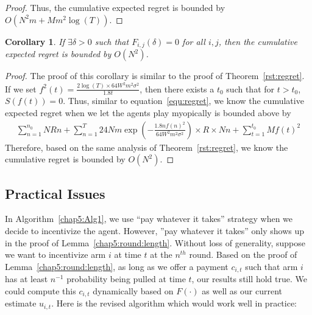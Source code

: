\documentclass{article}
\newtheorem{corollary}{Corollary}
\begin{document}
\begin{proof}
Thus, the cumulative expected regret is bounded by $O(N^2 m + M m^2\log(T))$.
\end{proof}

\begin{corollary}
If $\exists \delta>0$ such that $F_{i,j}(\delta)=0$ for all $i,j$, then the cumulative expected regret is bounded by $O(N^2)$.
\end{corollary}

\begin{proof}
The proof of this corollary is similar to the proof of Theorem~\ref{rst:regret}. If we set $f^2(t)=\frac{2\log(T)\times 64W^2 m^2\sigma^2}{1.8t}$, then there exists a $t_{0}$ such that for $t>t_{0}$, $S(f(t))=0$. Thus, similar to equation~\eqref{equ:regret}, we know the cumulative expected regret when we let the agents play myopically is bounded above by
\begin{align}
\sum_{n=1}^{n_{0}}NRn + \sum_{n=1}^{T} 24Nm\exp\left(-\frac{1.8n f(n)^2}{64 W^2 m^2\sigma^2}\right)\times R \times Nn+ \sum_{t=1}^{t_{0}}Mf(t)^2 \nonumber
\end{align}
Therefore, based on the same analysis of Theorem~\ref{rst:regret}, we know the cumulative regret is bounded by $O(N^2)$.
\end{proof}


\subsection{Practical Issues}
\label{sec:pi}

In Algorithm~\ref{chap5:Alg1}, we use ``pay whatever it takes'' strategy when we decide to incentivize the agent. However, ''pay whatever it takes'' only shows up in the proof of Lemma~\ref{chap5:round:length}. Without loss of generality, suppose we want to incentivize arm $i$ at time $t$ at the $n^{th}$ round. Based on the proof of Lemma~\ref{chap5:round:length}, as long as we offer a payment $c_{i,t}$ such that arm $i$ has at least $n^{-1}$ probability being pulled at time $t$, our results still hold true. We could compute this $c_{i,t}$ dynamically based on $F(\cdot)$ as well as our current estimate $u_{i,t}$. Here is the revised algorithm which would work well in practice:
\end{document}
